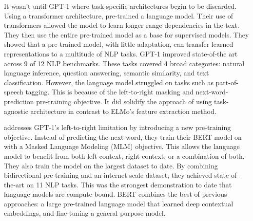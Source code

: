 It wasn’t until GPT-1 where task-specific architectures begin to be discarded. Using a transformer architecture, \cite{radford2018improving} pre-trained a language model. Their use of transformers allowed the model to learn longer range dependencies in the text. They then use the entire pre-trained model as a base for supervised models. They showed that a pre-trained model, with little adaptation, can transfer learned representations to a multitude of NLP tasks. GPT-1 improved state-of-the art across 9 of 12 NLP benchmarks. These tasks covered 4 broad categories: natural language inference, question answering, semantic similarity, and text classification. However, the language model struggled on tasks such as part-of-speech tagging. This is because of the left-to-right masking and next-word-prediction pre-training objective. It did solidify the approach of using task-agnostic architecture in contrast to ELMo’s feature extraction method.

\cite{DBLP:journals/corr/abs-1810-04805} addresses GPT-1’s left-to-right limitation by introducing a new pre-training objective. Instead of predicting the next word, they train their BERT model on with a Masked Language Modeling (MLM) objective. This allows the language model to benefit from both left-context, right-context, or a combination of both. They also train the model on the largest dataset to date. By combining bidirectional pre-training and an internet-scale dataset, they achieved state-of-the-art on 11 NLP tasks. This was the strongest demonstration to date that language models are compute-bound. BERT combines the best of previous approaches: a large pre-trained language model that learned deep contextual embeddings, and fine-tuning a general purpose model.



















